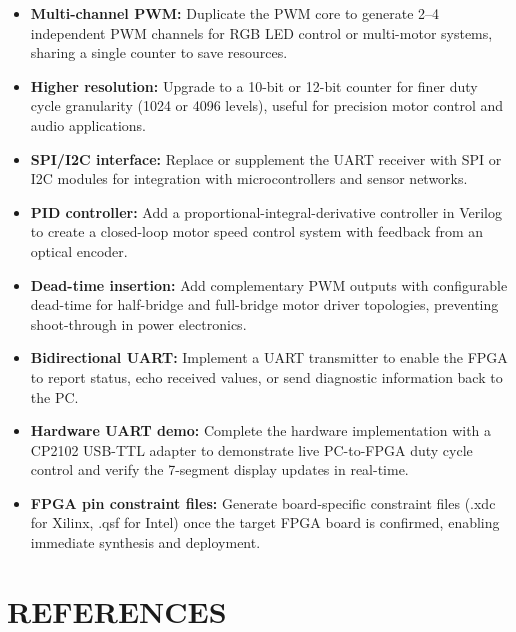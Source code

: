 \documentclass[12pt,a4paper]{article}
\begin{document}
\begin{itemize}
\item \textbf{Multi-channel PWM:} Duplicate the PWM core to generate 2--4 independent PWM channels for RGB LED control or multi-motor systems, sharing a single counter to save resources.

\item \textbf{Higher resolution:} Upgrade to a 10-bit or 12-bit counter for finer duty cycle granularity (1024 or 4096 levels), useful for precision motor control and audio applications.

\item \textbf{SPI/I2C interface:} Replace or supplement the UART receiver with SPI or I2C modules for integration with microcontrollers and sensor networks.

\item \textbf{PID controller:} Add a proportional-integral-derivative controller in Verilog to create a closed-loop motor speed control system with feedback from an optical encoder.

\item \textbf{Dead-time insertion:} Add complementary PWM outputs with configurable dead-time for half-bridge and full-bridge motor driver topologies, preventing shoot-through in power electronics.

\item \textbf{Bidirectional UART:} Implement a UART transmitter to enable the FPGA to report status, echo received values, or send diagnostic information back to the PC.

\item \textbf{Hardware UART demo:} Complete the hardware implementation with a CP2102 USB-TTL adapter to demonstrate live PC-to-FPGA duty cycle control and verify the 7-segment display updates in real-time.

\item \textbf{FPGA pin constraint files:} Generate board-specific constraint files (.xdc for Xilinx, .qsf for Intel) once the target FPGA board is confirmed, enabling immediate synthesis and deployment.
\end{itemize}

\section{REFERENCES}
\end{document}
